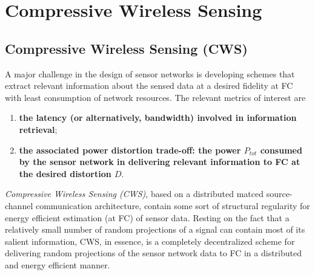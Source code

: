 \chapter{Compressive Wireless Sensing}
\label{CWS}

\section{Compressive Wireless Sensing (CWS)}
A major challenge in the design of sensor networks is developing \textcolor[rgb]{0,0,1}{schemes that extract relevant information about the sensed data} at a desired fidelity at FC with \textcolor[rgb]{0,0,1}{least consumption of network resources}. The relevant metrics of interest are
\begin{enumerate}
    \item \textbf{\textcolor[rgb]{0,0,1}{the latency (or alternatively, bandwidth) involved in information retrieval}};
    \item \textbf{\textcolor[rgb]{0,0,1}{the associated power distortion trade-off: the power $P_{tot}$ consumed by the sensor network in delivering relevant information to FC at the desired distortion $D$}}.
\end{enumerate}

\emph{\textcolor[rgb]{0,0,1}{Compressive Wireless Sensing (CWS)}}, based on a distributed matced source-channel communication architecture, contain some sort of structural regularity for energy efficient estimation (at FC) of sensor data. Resting on the fact that a relatively small number of random projections of a signal can contain most of its salient information, CWS, in essence, is a completely decentralized scheme for delivering random projections of the sensor network data to FC in a distributed and energy efficient manner. 
